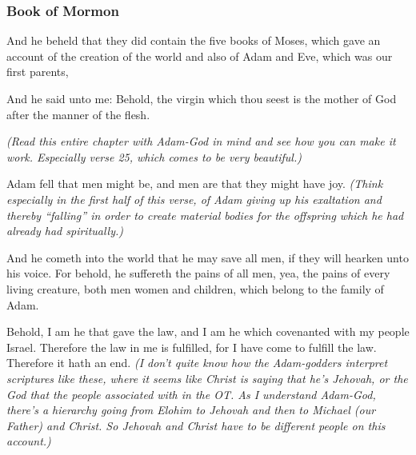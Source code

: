 		
	\subsubsection{Book of Mormon} %
		\label{ADAMGOD-BOM}
	
		
		\begin{compactdesc}
			\item[1 Nephi 5:11] And he beheld that they did contain the five books of Moses, which gave an account of the creation of the world and also of Adam and Eve, which was our first parents,
			\item[1 Nephi 11:18] And he said unto me: Behold, the virgin which thou seest is the mother of God after the manner of the flesh.
			\item[{\hyperref[2NEPHI-2]{2 Nephi 2}}] \textit{(Read this entire chapter with Adam-God in mind and see how you can make it work. Especially verse 25, which comes to be very beautiful.)}
			\item[{\hyperref[2NEPHI-2-25]{2 Nephi 2:25}}] Adam fell that men might be, and men are that they might have joy. \textit{(Think especially in the first half of this verse, of Adam giving up his exaltation and thereby ``falling'' in order to create material bodies for the offspring which he had already had spiritually.)}
			\item[2 Nephi 9:21] And he cometh into the world that he may save all men, if they will hearken unto his voice. For behold, he suffereth the pains of all men, yea, the pains of every living creature, both men women and children, which belong to the family of Adam.
			\item[3 Nephi 15:5] Behold, I am he that gave the law, and I am he which covenanted with my people Israel. Therefore the law in me is fulfilled, for I have come to fulfill the law. Therefore it hath an end. \textit{(I don't quite know how the Adam-godders interpret scriptures like these, where it seems like Christ is saying that he's Jehovah, or the God that the people associated with in the OT. As I understand Adam-God, there's a hierarchy going from Elohim to Jehovah and then to Michael (our Father) and Christ. So Jehovah and Christ have to be different people on this account.)}
		\end{compactdesc}
		

